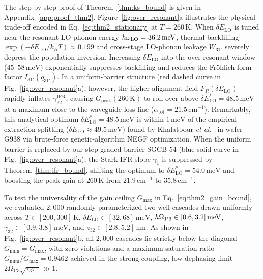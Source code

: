 \documentclass[11pt,letterpaper]{article}
\renewcommand{\hbar}{\mathchar'26\mkern-9mu h}
\begin{document}
The step-by-step proof of Theorem~\ref{thm:ks_bound} is given in Appendix~\ref{app:proof_thm2}. Figure~\ref{fig:over_resonant}a illustrates the physical trade-off encoded in Eq.~\eqref{eq:thm2_stationary} at $T = 260\,\mathrm{K}$. When $\delta E_{\mathrm{LO}}$ is tuned near the resonant LO-phonon energy $\hbar\omega_{\mathrm{LO}} = 36.2\,\mathrm{meV}$, thermal backfilling $\exp(-\delta E_{\mathrm{LO}}/k_B T) \approx 0.199$ and cross-stage LO-phonon leakage $W_{31'}$ severely depress the population inversion. Increasing $\delta E_{\mathrm{LO}}$ into the over-resonant window ($45\text{--}58\,\mathrm{meV}$) exponentially suppresses backfilling and reduces the Fr\"ohlich form factor $I_{31'}(q_{31'})$. In a uniform-barrier structure (red dashed curve in Fig.~\ref{fig:over_resonant}a), however, the higher alignment field $F_R(\delta E_{\mathrm{LO}})$ rapidly inflates $\gamma_{32}^{\mathrm{IFR}}$, causing $G_{\mathrm{peak}}(260\,\mathrm{K})$ to roll over above $\delta E_{\mathrm{LO}}^* = 48.5\,\mathrm{meV}$ at a maximum close to the waveguide loss line ($\alpha_{\mathrm{tot}} = 21.5\,\mathrm{cm}^{-1}$). Remarkably, this analytical optimum $\delta E_{\mathrm{LO}}^* = 48.5\,\mathrm{meV}$ is within $1\,\mathrm{meV}$ of the empirical extraction splitting ($\delta E_{\mathrm{LO}} \approx 49.5\,\mathrm{meV}$) found by Khalatpour \textit{et al.}~\cite{Khalatpour2023} in wafer G938 via brute-force genetic-algorithm NEGF optimization. When the uniform barrier is replaced by our step-graded barrier SGCB-54 (blue solid curve in Fig.~\ref{fig:over_resonant}a), the Stark IFR slope $\gamma_1$ is suppressed by Theorem~\ref{thm:ifr_bound}, shifting the optimum to $\delta E_{\mathrm{LO}}^* = 54.0\,\mathrm{meV}$ and boosting the peak gain at $260\,\mathrm{K}$ from $21.9\,\mathrm{cm}^{-1}$ to $35.8\,\mathrm{cm}^{-1}$.

To test the universality of the gain ceiling $G_{\max}$ in Eq.~\eqref{eq:thm2_gain_bound}, we evaluated $2{,}000$ randomly parameterized two-well cascades drawn uniformly across $T \in [200, 300]\,\mathrm{K}$, $\delta E_{\mathrm{LO}} \in [32, 68]\,\mathrm{meV}$, $\hbar\Omega_{1'3} \in [0.6, 3.2]\,\mathrm{meV}$, $\gamma_{32} \in [0.9, 3.8]\,\mathrm{meV}$, and $z_{32} \in [2.8, 5.2]\,\mathrm{nm}$. As shown in Fig.~\ref{fig:over_resonant}b, all $2{,}000$ cascades lie strictly below the diagonal $G_{\mathrm{num}} = G_{\max}$, with zero violations and a maximum saturation ratio $G_{\mathrm{num}}/G_{\max} = 0.9462$ achieved in the strong-coupling, low-dephasing limit $2\Omega_{1'3}\sqrt{\tau_3\tau_\perp} \gg 1$.
\end{document}
